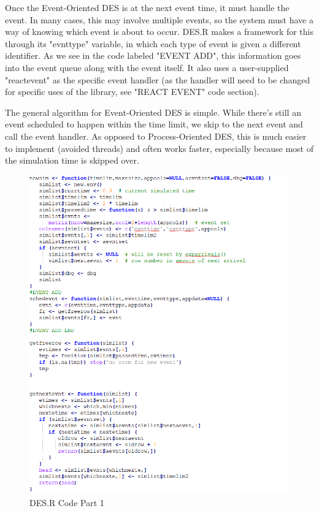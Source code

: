 \documentclass[a4paper, 11pt]{article} %
\begin{document}
Once the Event-Oriented DES is at the next event time, it must handle the event. In many cases, this may involve multiple events, so the system must have a way of knowing which event is about to occur. DES.R makes a framework for this through its "evnttype" variable, in which each type of event is given a different identifier. As we see in the code labeled "EVENT ADD", this information goes into the event queue along with the event itself. It also uses a user-supplied "reactevent" as the specific event handler (as the handler will need to be changed for specific uses of the library, see "REACT EVENT" code section). 

The general algorithm for Event-Oriented DES is simple. While there's still an event scheduled to happen within the time limit, we skip to the next event and call the event handler. As opposed to Process-Oriented DES, this is much easier to implement (avoided threads) and often works faster, especially because most of the simulation time is skipped over.\pagebreak

\begin{figure}[H]
	\caption{DES.R Code Part 1}
	\includegraphics{des1}
	\centering
\end{figure} \pagebreak
\end{document}
